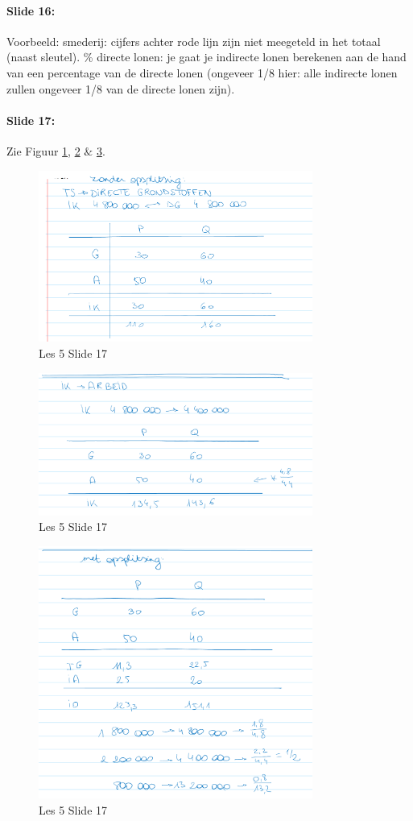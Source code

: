 \documentclass[10pt,a4paper]{report}
\begin{document}
\paragraph{Slide 16:} Voorbeeld: smederij: cijfers achter rode lijn zijn niet meegeteld in het totaal (naast sleutel).
\% directe lonen: je gaat je indirecte lonen berekenen aan de hand van een percentage van de directe lonen (ongeveer 1/8 hier: alle indirecte lonen zullen ongeveer 1/8 van de directe lonen zijn).

\paragraph{Slide 17:} Zie Figuur \ref{les05_01}, \ref{les05_02} $\&$ \ref{les05_03}.

\begin{figure}[h!]
\centering
\includegraphics[width=90mm]{Les05_01.png}
\caption{Les 5 Slide 17} 
\label{les05_01}
\end{figure}

\begin{figure}[h!]
\centering
\includegraphics[width=90mm]{Les05_02.png}
\caption{Les 5 Slide 17} 
\label{les05_02}
\end{figure}

\begin{figure}[h!]
\centering
\includegraphics[width=90mm]{Les05_03.png}
\caption{Les 5 Slide 17} 
\label{les05_03}
\end{figure}
\end{document}
